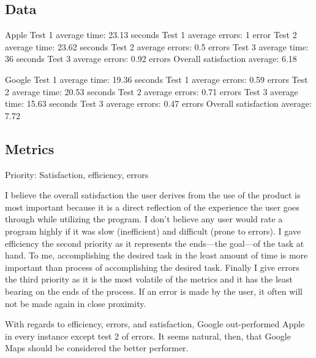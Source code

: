 \documentclass[12pt, oneside]{article}
\begin{document}
\subsection{Data}

Apple
Test 1 average time: 23.13 seconds
Test 1 average errors: 1 error
Test 2 average time: 23.62 seconds
Test 2 average errors: 0.5 errors 
Test 3 average time: 36 seconds
Test 3 average errors: 0.92 errors
Overall satisfaction average: 6.18

Google
Test 1 average time: 19.36 seconds
Test 1 average errors: 0.59 errors
Test 2 average time: 20.53 seconds
Test 2 average errors: 0.71 errors 
Test 3 average time: 15.63 seconds
Test 3 average errors: 0.47 errors
Overall satisfaction average: 7.72

\subsection{Metrics}

Priority: Satisfaction, efficiency, errors

I believe the overall satisfaction the user derives from the use of the product is most important because it is a direct reflection of the experience the user goes through while utilizing the program. I don’t believe any user would rate a program highly if it was slow (inefficient) and difficult (prone to errors). I gave efficiency the second priority as it represents the ends—the goal—of the task at hand. To me, accomplishing the desired task in the least amount of time is more important than process of accomplishing the desired task. Finally I give errors the third priority as it is the most volatile of the metrics and it has the least bearing on the ends of the process. If an error is made by the user, it often will not be made again in close proximity.

With regards to efficiency, errors, and satisfaction, Google out-performed Apple in every instance except test 2 of errors. It seems natural, then, that Google Maps should be considered the better performer.
\end{document}
